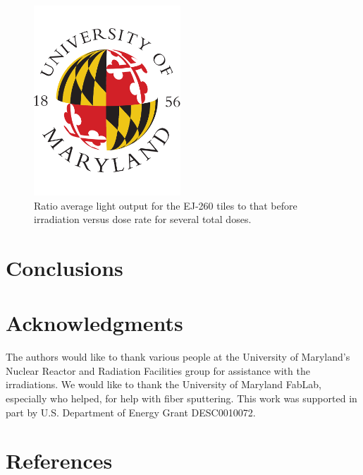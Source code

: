 \documentclass[review]{elsarticle}
\begin{document}
\begin{figure}[!ht]
\begin{center}
\includegraphics[width=0.49\textwidth]{./figures/placeholder.pdf}
\caption{
Ratio average light output for the EJ-260 tiles to that before irradiation versus dose rate for several total doses.
}
\label{fig:fig3}
\end{center}
\end{figure}





\section{Conclusions}

\section{Acknowledgments}
The authors would like to thank {\color{red} various people} at
the University of Maryland's Nuclear Reactor and Radiation
Facilities group for assistance
with the irradiations.  We would like to thank the University of Maryland
FabLab, especially {\color{red} who helped}, for help with fiber sputtering.
This work was supported in part by U.S. Department of Energy Grant DESC0010072.

\section*{References}


\end{document}
